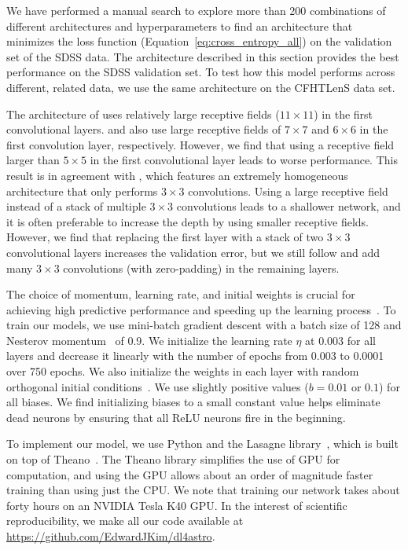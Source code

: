 \documentclass[fleqn,usenatbib]{mnras}
\begin{document}
We have performed a manual search to explore more than 200 combinations of different architectures
and hyperparameters to find an architecture that minimizes the loss function
(Equation~\ref{eq:cross_entropy_all}) on the validation set of the SDSS data.
The architecture described in this section provides the best performance on
the SDSS validation set.
To test how this model performs across different, related data,
we use the same architecture on the CFHTLenS data set.

The architecture of \cite{krizhevsky2012imagenet}
uses relatively large receptive fields ($11\times11$) in the first convolutional layers.
\citet{zeiler2014visualizing} and \cite{dieleman2015rotation}
also use large receptive fields of $7\times7$ and $6\times6$
in the first convolution layer, respectively.
However, we find that using a receptive field larger than $5\times5$ in the first
convolutional layer leads to worse performance.
This result is in agreement with \citet{simonyan2014very},
which features an extremely homogeneous architecture that only performs
$3\times3$ convolutions.
Using a large receptive field instead of a stack of multiple $3\times3$ convolutions
leads to a shallower network, and it is often preferable to increase
the depth by using smaller receptive fields.
However, we find that replacing the first layer with
a stack of two $3\times3$ convolutional layers increases the validation error,
but we still follow \citet{simonyan2014very} and add many
$3\times3$ convolutions (with zero-padding) in the remaining layers.


The choice of momentum, learning rate, and initial weights is crucial
for achieving high predictive performance and speeding up the learning
process~\citep{sutskever2013importance}.
To train our models, we use mini-batch gradient descent with a batch size of 128
and Nesterov momentum~\citep{bengio2013advances} of 0.9.
We initialize the learning rate $\eta$ at 0.003 for all layers and
decrease it linearly with the number of epochs 
from 0.003 to 0.0001 over 750 epochs.
We also initialize the weights in each layer with random orthogonal initial 
conditions~\citep{saxe2013exact}.
We use slightly positive values ($b=0.01$ or $0.1$) for all biases.
We find initializing biases to a small constant value helps eliminate dead neurons
by ensuring that all ReLU neurons fire in the beginning.

To implement our model, we use Python and the Lasagne
library~\citep{dieleman2015lasagne}, which is built on top of
Theano~\citep{theano2016theano}.
The Theano library simplifies the use of GPU for computation, and using the GPU
allows about an order of magnitude faster training than using just the CPU.
We note that training our network takes about forty hours on an NVIDIA Tesla
K40 GPU.
In the interest of scientific reproducibility, we make all our code available
at \href{https://github.com/EdwardJKim/dl4astro}{https://github.com/EdwardJKim/dl4astro}.
\end{document}

